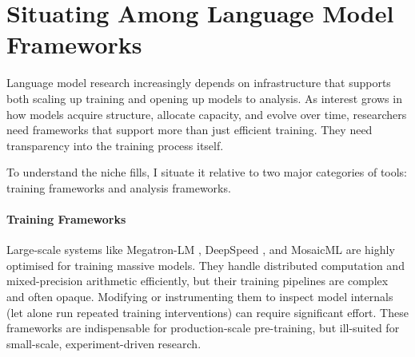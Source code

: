 \section[Situating \picomed Among Language Model Frameworks]{Situating \picolarge Among Language Model Frameworks}
\label{sec:pico-related}

Language model research increasingly depends on infrastructure that supports both scaling up training and opening up models to analysis. As interest grows in how models acquire structure, allocate capacity, and evolve over time, researchers need frameworks that support more than just efficient training. They need transparency into the training process itself.

To understand the niche \pico fills, I situate it relative to two major categories of tools: training frameworks and analysis frameworks.


\paragraph{Training Frameworks}
Large-scale systems like Megatron-LM \citep{narayanan2021megatron}, DeepSpeed \citep{rasley2020deepspeed}, and MosaicML \citep{mosaic2023mpt} are highly optimised for training massive models. They handle distributed computation and mixed-precision arithmetic efficiently, but their training pipelines are complex and often opaque. Modifying or instrumenting them to inspect model internals (let alone run repeated training interventions) can require significant effort. These frameworks are indispensable for production-scale pre-training, but ill-suited for small-scale, experiment-driven research.

